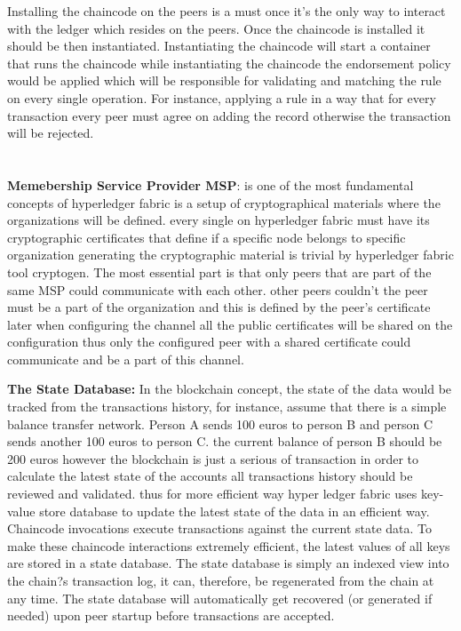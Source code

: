 Installing the chaincode on the peers is a must once it's the only way to interact with the ledger which resides on the peers. 
Once the chaincode is installed it should be then instantiated. 
Instantiating the chaincode will start a container that runs the chaincode while instantiating the chaincode the endorsement policy would be applied which will be responsible for validating and matching the rule on every single operation. For instance, applying a rule in a way  that for every transaction every peer must agree on adding the record otherwise the transaction will be rejected. \\  \\  \\ 
 
\textbf{Memebership Service Provider MSP}: is one of the most fundamental concepts of hyperledger fabric is a setup of cryptographical materials where the organizations will be defined. every single on hyperledger fabric must have its cryptographic certificates that define if a specific node belongs to specific organization generating the cryptographic material is trivial by hyperledger fabric tool cryptogen. 
The most essential part is that only peers that are part of the same MSP could communicate with each other. other peers couldn't the peer must be a part of the organization and this is defined by the peer's certificate later when configuring the channel all the public certificates will be shared on the configuration thus only the configured peer with a shared certificate could communicate and be a part of this channel. 

\textbf{The State Database:} In the blockchain concept, the state of the data would be tracked from the transactions history, for instance, assume that there is a simple balance transfer network. Person A sends 100 euros to person B and person C sends another 100 euros to person C. the current balance of person B should be 200 euros however the blockchain is just a serious of transaction in order to calculate the latest state of the accounts all transactions history should be reviewed and validated. thus for more efficient way hyper ledger fabric uses key-value store database to update the latest state of the data in an efficient way.
Chaincode invocations execute transactions against the current state data. To make these chaincode interactions extremely efficient, the latest values of all keys are stored in a state database. The state database is simply an indexed view into the chain?s transaction log, it can, therefore, be regenerated from the chain at any time. The state database will automatically get recovered (or generated if needed) upon peer startup before transactions are accepted.

